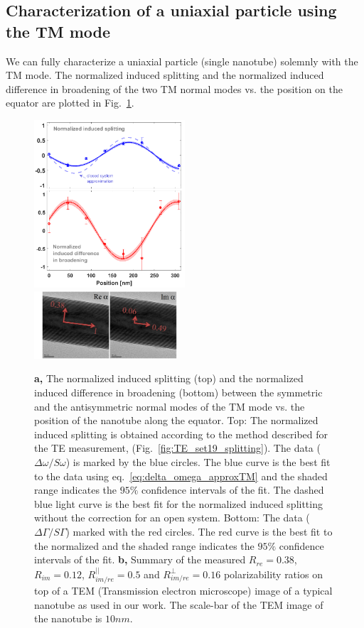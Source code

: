 \documentclass[journal=jacsat,manuscript=article]{achemso}
\begin{document}
\subsection{Characterization of a uniaxial particle using the TM mode}

We can fully characterize a uniaxial particle (single  nanotube) solemnly with the TM mode. The normalized induced splitting and the normalized induced difference in broadening of the two TM normal modes vs. the position on the equator are plotted in Fig.~\ref{fig:TM_width_splitting}.

\begin{figure}[H]
\centering
   \includegraphics[width=0.5\textwidth]{Images/NTset5TM-addphase038.png}\\
    \includegraphics[width=0.475\textwidth]{Images/TEM_NT_ratio_038A.png}
    \caption{ \textbf{a,} The normalized induced splitting (top) and the normalized induced difference in broadening (bottom) between the symmetric and the antisymmetric normal modes of the TM mode vs. the position of the nanotube along the equator. Top: The normalized induced splitting is obtained according to the method described for the TE measurement, (Fig.~\ref{fig:TE_set19_splitting}). The data ($\Delta \omega / \textit{S} \omega$) is marked by the blue circles. The blue curve is the best fit to the data using eq.~\ref{eq:delta_omega_approxTM} and the shaded range indicates the $95\%$ confidence intervals of the fit.
    The dashed blue light curve is the best fit for the normalized induced splitting without the correction for an open system. Bottom: The data ($\Delta \Gamma / \textit{S} \Gamma$) marked with the red circles. The red curve is the best fit to the normalized and the shaded range indicates the $95\%$ confidence intervals of the fit.
    \textbf{b,} Summary of the measured $R_{re}=0.38$, $R_{im}=0.12$, $R_{im/re}^{||}=0.5$ and $R_{im/re}^{\perp}=0.16$ polarizability ratios on top of a TEM (Transmission electron microscope) image of a typical  nanotube as  used in our work. The scale-bar of the TEM image of the nanotube is $10nm$.}
\label{fig:TM_width_splitting}
\end{figure}
\end{document}
